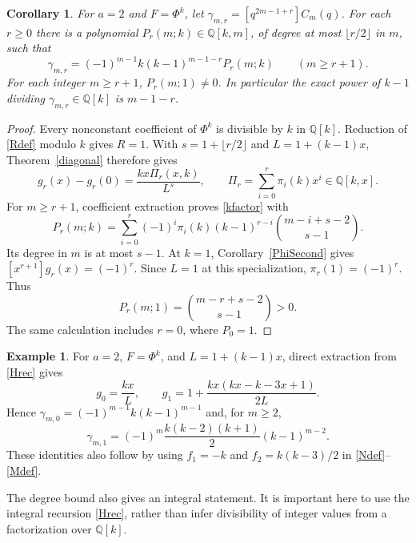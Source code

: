 \documentclass[11pt]{amsart}
\newtheorem{corollary}[theorem]{Corollary}
\theoremstyle{definition}
\newtheorem{example}[theorem]{Example}
\theoremstyle{remark}
\numberwithin{equation}{section}
\newcommand{\Q}{\mathbb Q}\newcommand{\Z}{\mathbb Z}\newcommand{\C}{\mathbb C}
\begin{document}
\begin{corollary}\label{kpolynomial}
For $a=2$ and $F=\Phi^k$, let $\gamma_{m,r}=[q^{2m-1+r}]C_m(q)$. For each $r\ge0$ there is a polynomial $P_r(m;k)\in\Q[k,m]$, of degree at most $\lfloor r/2\rfloor$ in $m$, such that
\begin{equation}\label{kfactor}
 \gamma_{m,r}=(-1)^{m-1}k(k-1)^{m-1-r}P_r(m;k)
 \qquad(m\ge r+1).
\end{equation}
For each integer $m\ge r+1$, $P_r(m;1)\ne0$. In particular the exact power of $k-1$ dividing $\gamma_{m,r}\in\Q[k]$ is $m-1-r$.
\end{corollary}
\begin{proof}
Every nonconstant coefficient of $\Phi^k$ is divisible by $k$ in $\Q[k]$. Reduction of \eqref{Rdef} modulo $k$ gives $R=1$. With $s=1+\lfloor r/2\rfloor$ and $L=1+(k-1)x$, Theorem~\ref{diagonal} therefore gives
\[
 g_r(x)-g_r(0)=\frac{kx\Pi_r(x,k)}{L^s},\qquad
 \Pi_r=\sum_{i=0}^r\pi_i(k)x^i\in\Q[k,x].
\]
For $m\ge r+1$, coefficient extraction proves \eqref{kfactor} with
\[
 P_r(m;k)=\sum_{i=0}^r(-1)^i\pi_i(k)(k-1)^{r-i}
                 \binom{m-i+s-2}{s-1}.
\]
Its degree in $m$ is at most $s-1$. At $k=1$, Corollary~\ref{PhiSecond} gives
$[x^{r+1}]g_r(x)=(-1)^r$. Since $L=1$ at this specialization, $\pi_r(1)=(-1)^r$. Thus
\[
 P_r(m;1)=\binom{m-r+s-2}{s-1}>0.
\]
The same calculation includes $r=0$, where $P_0=1$.
\end{proof}

\begin{example}
For $a=2$, $F=\Phi^k$, and $L=1+(k-1)x$, direct extraction from \eqref{Hrec} gives
\[
 g_0=\frac{kx}{L},\qquad
 g_1=1+\frac{kx(kx-k-3x+1)}{2L}.
\]
Hence $\gamma_{m,0}=(-1)^{m-1}k(k-1)^{m-1}$ and, for $m\ge2$,
\[
 \gamma_{m,1}=(-1)^m\frac{k(k-2)(k+1)}2(k-1)^{m-2}.
\]
These identities also follow by using $f_1=-k$ and $f_2=k(k-3)/2$ in \eqref{Ndef}--\eqref{Mdef}.
\end{example}

The degree bound also gives an integral statement. It is important here to use the integral recursion \eqref{Hrec}, rather than infer divisibility of integer values from a factorization over $\Q[k]$.
\end{document}
